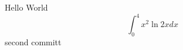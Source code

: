 \documentclass{article}
\begin{document}
Hello World
$$\int_0^4 x^2 \ln{2x}dx$$
second committ
\end{document}
